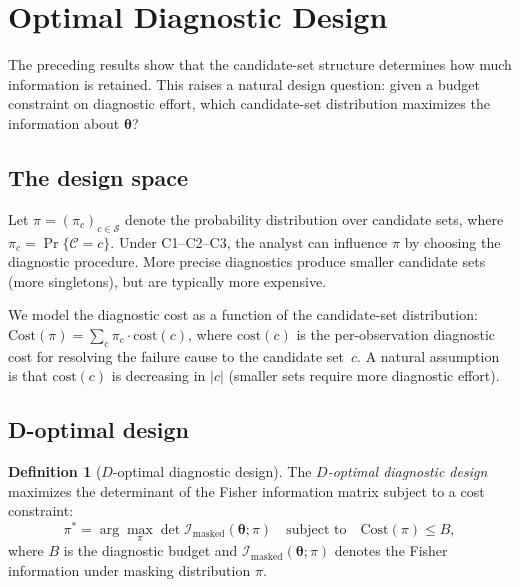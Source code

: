 \documentclass[11pt]{article}
\theoremstyle{definition}
\newtheorem{definition}{Definition}
\theoremstyle{plain}
\renewcommand{\v}[1]{\boldsymbol{#1}}
\newcommand{\btheta}{\v{\theta}}
\newcommand{\FI}{\mathcal{I}}       %
\begin{document}
\section{Optimal Diagnostic Design}
\label{sec:design}

The preceding results show that the candidate-set structure determines
how much information is retained.
This raises a natural design question: given a budget constraint on
diagnostic effort, which candidate-set distribution maximizes the
information about $\btheta$?

\subsection{The design space}

Let $\pi = (\pi_c)_{c \in \mathcal{S}}$ denote the probability
distribution over candidate sets, where $\pi_c = \Pr\{\mathcal{C} = c\}$.
Under C1--C2--C3, the analyst can influence $\pi$ by choosing the
diagnostic procedure.
More precise diagnostics produce smaller candidate sets
(more singletons), but are typically more expensive.

We model the diagnostic cost as a function of the candidate-set
distribution: $\text{Cost}(\pi) = \sum_c \pi_c \cdot \text{cost}(c)$,
where $\text{cost}(c)$ is the per-observation diagnostic cost for
resolving the failure cause to the candidate set~$c$.
A natural assumption is that $\text{cost}(c)$ is decreasing in $|c|$
(smaller sets require more diagnostic effort).

\subsection{D-optimal design}

\begin{definition}[$D$-optimal diagnostic design]
\label{def:d-optimal}
The \emph{$D$-optimal diagnostic design} maximizes the determinant
of the Fisher information matrix subject to a cost constraint:
\begin{equation}
\label{eq:d-optimal}
    \pi^* = \arg\max_\pi \det \FI_{\mathrm{masked}}(\btheta; \pi)
    \quad \text{subject to} \quad
    \text{Cost}(\pi) \leq B,
\end{equation}
where $B$ is the diagnostic budget and
$\FI_{\mathrm{masked}}(\btheta; \pi)$ denotes the Fisher information
under masking distribution $\pi$.
\end{definition}
\end{document}
